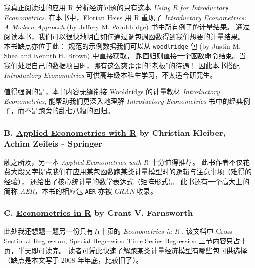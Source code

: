\documentclass[11pt,hyperref]{ctexart}
\begin{document}
我真正阅读过的应用 R 分析经济问题的只有这本 \emph{Using R for
Introductory Econometrics}. 在本书中，Florian Heiss 用 R 重现了
\emph{Introductory Econometrics: A Modern Approach} (by Jeffrey M.
Wooldridge) 书中所有例子的计量结果。
通过阅读本书，我们可以很快地明白如何通过调包调函数得到我们想要的计量结果。
本书缺点亦位于此： 规范的示例数据我们可以从 \texttt{woodlridge} 包 (by
Justin M. Shea and Kennth H. Brown) 中直接获取，
跑回归则直接一个函数命令结束。当我们处理自己的数据项目时，哪有这么爽歪歪的``老板''的待遇！
因此本书搭配 \emph{Introductory Econometrics}
可供高年级本科生学习，不太适合研究生。

值得强调的是，本书内容无缝衔接 Wooldridge 的计量教材 \emph{Introductory
Econometrics}, 能帮助我们更深入地理解 \emph{Introductory Econometrics}
书中的经典例子，而不是跑旁的乱七八糟的回归。

\hypertarget{b.-applied-econometrics-with-r-by-christian-kleiber-achim-zeileis---springer}{%
\subsubsection{\texorpdfstring{B.
\href{https://eeecon.uibk.ac.at/~zeileis/teaching/AER/}{Applied
Econometrics with R} by Christian Kleiber, Achim Zeileis -
Springer}{B. Applied Econometrics with R by Christian Kleiber, Achim Zeileis - Springer}}\label{b.-applied-econometrics-with-r-by-christian-kleiber-achim-zeileis---springer}}

触之所及，另一本 \emph{Applied Econometrics with R} 十分值得推荐。
此书作者不仅花费大段文字提点我们在应用某包函数跑某类计量模型时的逻辑与注意事项（难得的经验），
还给出了核心统计量的数学表达式（矩阵形式）。 此书还有一个高大上的简称
\emph{AER}，本书的相应包 \texttt{AER} 亦被 \emph{CRAN} 收录。

\hypertarget{c.-econometrics-in-r-by-grant-v.-farnsworth}{%
\subsubsection{\texorpdfstring{C.
\href{https://cran.r-project.org/doc/contrib/Farnsworth-EconometricsInR.pdf}{Econometrics
in R} by Grant V.
Farnsworth}{C. Econometrics in R by Grant V. Farnsworth}}\label{c.-econometrics-in-r-by-grant-v.-farnsworth}}

此处我还想题一题另一份只有五十页的 \emph{Econometrics in R} . 该文档中
Cross Sectional Regression, Special Regression Time Series Regression
三节内容只占十页，半天即可读完。
读者可凭此快速了解跑某类计量经济模型有哪些包可供选择（缺点是本文写于
2008 年年底，比较旧了）。
\end{document}
